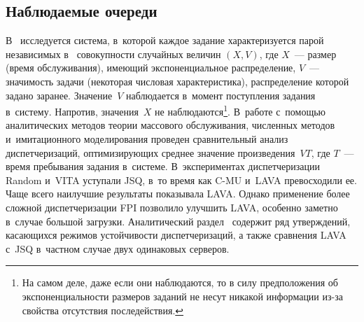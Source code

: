 \begin{multicols}{2}

\subsection{Наблюдаемые очереди}


В~\cite{31-kon} исследуется система, в~которой каждое задание характеризуется парой независимых в~
совокупности случайных величин $(X,V)$, где $X$~--- размер (время обслуживания), имеющий 
экспоненциальное распределение, $V$~--- значимость задачи (некоторая числовая характеристика), 
распределение которой задано заранее. Значение~$V$ наблюдается в~момент поступления задания 
в~систему. Напротив, значения~$X$ не наблюдаются\footnote{На самом деле, даже если они наблюдаются, то 
в силу предположения об экспоненциальности размеров заданий не несут никакой информации из-за 
свойства отсутствия последействия.}. В~работе с~помощью аналитических методов теории массового 
обслуживания, численных методов и~имитационного моделирования проведен сравнительный анализ 
диспетчеризаций, оптимизирующих среднее значение произведения~$VT$, где $T$~--- время пребывания 
задания в~системе. В~экспериментах диспетчеризации Random и~VITA уступали JSQ, в~то время как C-MU 
и~LAVA превосходили ее. Чаще всего наилучшие результаты показывала LAVA. Однако применение более 
сложной диспетчеризации FPI позволило улучшить LAVA, особенно заметно в~случае большой загрузки. 
Аналитический раздел~\cite{31-kon} содержит ряд утверждений, касающихся режимов устойчивости 
диспетчеризаций, а также сравнения LAVA с~JSQ в~частном случае двух одинаковых серверов.
    

\end{multicols}
